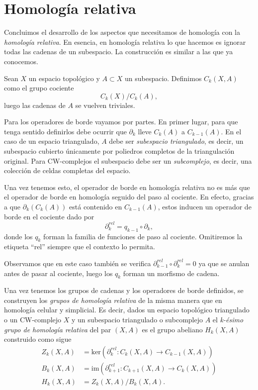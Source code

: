 
\section{Homología relativa}
\label{sec:hom_relat}

Concluimos el desarrollo de los aspectos que necesitamos de homología con la \textit{homología relativa}. En esencia, en homología relativa lo que hacemos es ignorar todas las cadenas de un subespacio. La construcción es similar a las que ya conocemos.

\begin{definition}
    Sean $X$ un espacio topológico y $A\subset X$ un subespacio. Definimos $C_k(X,A)$ como el grupo cociente
    \begin{equation*}
        C_k(X)/C_k(A),
    \end{equation*} 
    luego las cadenas de $A$ se vuelven triviales.
\end{definition}
 
Para los operadores de borde vayamos por partes. En primer lugar, para que tenga sentido definirlos debe ocurrir que $\partial_k$ lleve $C_k(A)$ a $C_{k-1}(A)$. En el caso de un espacio triangulado, $A$ debe ser \textit{subespacio triangulado}, es decir, un subespacio cubierto únicamente por poliedros completos de la triangulación original. Para CW-complejos el subespacio debe ser un \textit{subcomplejo}, es decir, una colección de celdas completas del espacio.

Una vez tenemos esto, el operador de borde en homología relativa no es más que el operador de borde en homología seguido del paso al cociente. En efecto, gracias a que $\partial_k(C_k(A))$ está contenido en $C_{k-1}(A)$, estos inducen un operador de borde en el cociente dado por
\begin{equation*}
    \partial^{rel}_k = q_{k-1}\circ\partial_k,
\end{equation*} 
donde los $q_k$ forman la familia de funciones de paso al cociente. Omitiremos la etiqueta ``rel'' siempre que el contexto lo permita.

Observamos que en este caso también se verifica $\partial^{rel}_{k-1}\circ \partial^{rel}_k = 0$ ya que se anulan antes de pasar al cociente, luego los $q_k$ forman un morfismo de cadena.

\newpage
Una vez tenemos los grupos de cadenas y los operadores de borde definidos, se construyen los \textit{grupos de homología relativa} de la misma manera que en homología celular y simplicial. Es decir, dados un espacio topológico triangulado o un CW-complejo $X$ y un subespacio triangulado o subcomplejo $A$ el \textit{k-ésimo grupo de homología relativa} del par $(X,A)$ es el grupo abeliano $H_k(X,A)$ construido como sigue
\begin{align*}
    Z_k(X,A) &= \text{ker}(\partial^{rel}_k: C_k(X,A) \to C_{k-1}(X,A)) \\
    B_k(X,A) &= \text{im}(\partial^{rel}_{k+1}: C_{k+1}(X,A) \to C_{k}(X,A)) \\
    H_k(X,A) &= Z_k(X,A)/B_k(X,A).
\end{align*}

